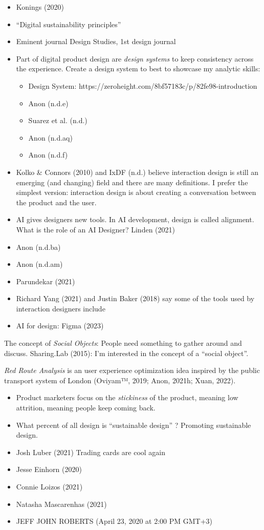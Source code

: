 \documentclass[
  letterpaper,
  DIV=11,
  numbers=noendperiod]{scrartcl}
\providecommand{\tightlist}{%
  \setlength{\itemsep}{0pt}\setlength{\parskip}{0pt}}\usepackage{longtable,booktabs,array}
\begin{document}
\begin{itemize}
\tightlist
\item
  Konings (2020)
\item
  ``Digital sustainability principles''
\item
  Eminent journal Design Studies, 1st design journal
\item
  Part of digital product design are \emph{design systems} to keep
  consistency across the experience. Create a design system to best to
  showcase my analytic skills:

  \begin{itemize}
  \tightlist
  \item
    Design System:
    https://zeroheight.com/8bf57183c/p/82fe98-introduction
  \item
    Anon (n.d.e)
  \item
    Suarez et al. (n.d.)
  \item
    Anon (n.d.aq)
  \item
    Anon (n.d.f)
  \end{itemize}
\item
  Kolko \& Connors (2010) and IxDF (n.d.) believe interaction design is
  still an emerging (and changing) field and there are many definitions.
  I prefer the simplest version: interaction design is about creating a
  conversation between the product and the user.
\item
  AI gives designers new tools. In AI development, design is called
  alignment. What is the role of an AI Designer? Linden (2021)
\item
  Anon (n.d.ba)
\item
  Anon (n.d.am)
\item
  Parundekar (2021)
\item
  Richard Yang (2021) and Justin Baker (2018) say some of the tools used
  by interaction designers include
\item
  AI for design: Figma (2023)
\end{itemize}

The concept of \emph{Social Objects}: People need something to gather
around and discuss. Sharing.Lab (2015): I'm interested in the concept of
a ``social object''.

\emph{Red Route Analysis} is an user experience optimization idea
inspired by the public transport system of London (Oviyam™, 2019; Anon,
2021h; Xuan, 2022).

\begin{itemize}
\tightlist
\item
  Product marketers focus on the \emph{stickiness} of the product,
  meaning low attrition, meaning people keep coming back.
\item
  What percent of all design is ``sustainable design'' ? Promoting
  sustainable design.
\item
  Josh Luber (2021) Trading cards are cool again
\item
  Jesse Einhorn (2020)
\item
  Connie Loizos (2021)
\item
  Natasha Mascarenhas (2021)
\item
  JEFF JOHN ROBERTS (April 23, 2020 at 2:00 PM GMT+3)
\end{itemize}
\end{document}
